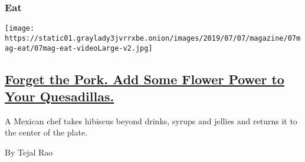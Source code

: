 \begin{enumerate}
{  \subsubsection{Eat}\label{eat}}

  \texttt{[image: https://static01.graylady3jvrrxbe.onion/images/2019/07/07/magazine/07mag-eat/07mag-eat-videoLarge-v2.jpg]}

  \hypertarget{forget-the-pork-add-some-flower-power-to-your-quesadillas}{%
  \subsection{\texorpdfstring{\href{/2019/07/02/magazine/hibiscus-quesadilla-recipe.html}{Forget
  the Pork. Add Some Flower Power to Your
  Quesadillas.}}{Forget the Pork. Add Some Flower Power to Your Quesadillas.}}\label{forget-the-pork-add-some-flower-power-to-your-quesadillas}}

  A Mexican chef takes hibiscus beyond drinks, syrups and jellies and
  returns it to the center of the plate.

  By Tejal Rao
\end{enumerate}

